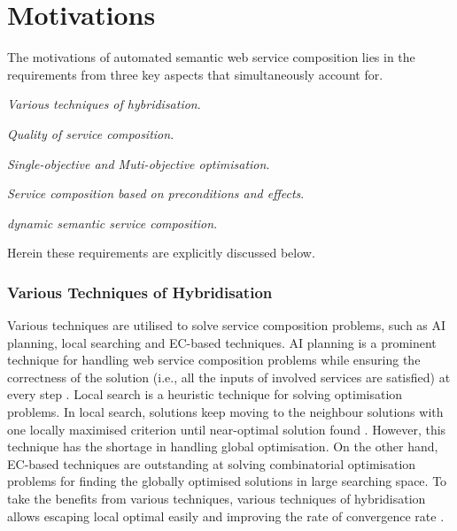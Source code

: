 \section{Motivations}
The motivations of automated semantic web service composition lies in the requirements from three key aspects that simultaneously account for. 
\begin{enumerate*}
 \item \emph{Various techniques of hybridisation}.
 \item \emph{Quality of service composition}.
 \item \emph{Single-objective and Muti-objective optimisation}.
 \item \emph{Service composition based on preconditions and effects}.
 \item \emph{dynamic semantic service composition}.
\end{enumerate*}
Herein these requirements are explicitly discussed below. 
\subsubsection{Various Techniques of Hybridisation}

Various techniques are utilised to solve service composition problems, such as AI planning, local searching and EC-based techniques. AI planning is a prominent technique for handling web service composition problems while ensuring the correctness of the solution (i.e., all the inputs of involved services are satisfied) at every step \cite{wang2014automated}.  Local search is a heuristic technique for solving optimisation problems. In local search, solutions keep moving to the neighbour solutions with one locally maximised criterion until near-optimal solution found \cite{parejo2008qos}. However, this technique has the shortage in handling global optimisation.  On the other hand, EC-based techniques are outstanding at solving combinatorial optimisation problems for finding the globally optimised solutions in large searching space. To take the benefits from various techniques,  various techniques of hybridisation allows escaping local optimal easily and improving the rate of convergence rate \cite{renders1996hybrid}.

